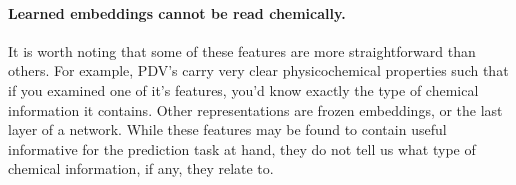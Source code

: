 %


\paragraph{Learned embeddings cannot be read chemically.}

It is worth noting that some of these features are more straightforward than others. For example, PDV's carry very clear physicochemical properties such that if you examined one of it's features, you'd know exactly the type of chemical information it contains. Other representations are frozen embeddings, or the last layer of a network. While these features may be found to contain useful informative for the prediction task at hand, they do not tell us what type of chemical information, if any, they relate to.


